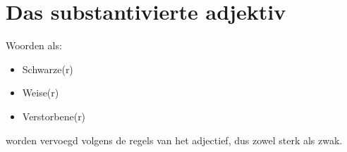 \documentclass[main.tex]{subfiles}
\begin{document}
\section{Das substantivierte adjektiv}

Woorden als:
\begin{itemize}
\item Schwarze(r)
\item Weise(r)
\item Verstorbene(r)
\end{itemize}

worden vervoegd volgens de regels van het adjectief, dus zowel sterk als zwak.
\end{document}
